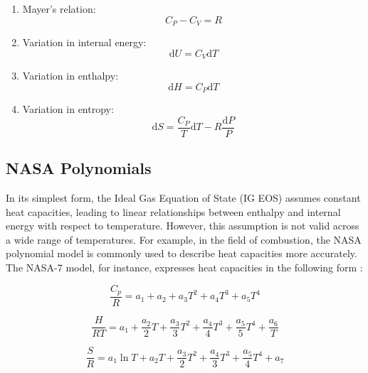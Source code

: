 	\begin{enumerate}
		\item Mayer's relation:
		\begin{equation}
			C_P - C_V = R
		\end{equation}

		\item Variation in internal energy:
		\begin{equation}
			\mathrm{d}U = C_V\mathrm{d}T
		\end{equation}

		\item Variation in enthalpy:
		\begin{equation}
			\mathrm{d}H = C_P\mathrm{d}T
		\end{equation}

		\item Variation in entropy:
		\begin{equation}
			\mathrm{d}S = \frac{C_P}{T}\mathrm{d}T - R\frac{\mathrm{d}P}{P}
		\end{equation}

	\end{enumerate}

	\subsection{NASA Polynomials}
	
	In its simplest form, the Ideal Gas Equation of State (IG EOS) assumes
	constant heat capacities, leading to linear relationships between enthalpy
	and internal energy with respect to temperature. However, this assumption is
	not valid across a wide range of temperatures. For example, in the field of
	combustion, the NASA polynomial model is commonly used to describe heat
	capacities more accurately. The NASA-7 model, for instance, expresses heat
	capacities in the following form \cite{gardiner1984combustion}:

	\begin{equation}
		\frac{C_p}{R} = a_1 + a_2 + a_3 T^2 + a_4 T^3 + a_5 T^4
	\end{equation}

	\begin{equation}
		\frac{H}{RT} = a_1 + \frac{a_2}{2}T + \frac{a_3}{3}T^2 + \frac{a_4}{4}T^3 + \frac{a_5}{5}T^4 + \frac{a_6}{T}
	\end{equation}

	\begin{equation}
		\frac{S}{R} = a_1 \ln T + a_2 T + \frac{a_3}{2}T^2 + \frac{a_4}{3}T^3 + \frac{a_5}{4}T^4 + a_7
	\end{equation}


